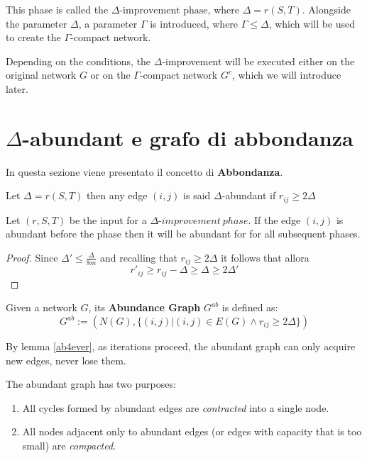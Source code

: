 This phase is called the \(\Delta\text{-improvement phase}\), where \(\Delta = r(S, T)\). Alongside the parameter \(\Delta\), a parameter \(\Gamma\) is introduced, where \(\Gamma \leq \Delta\), which will be used to create the \(\Gamma\)-compact network.

Depending on the conditions, the \(\Delta\)-improvement will be executed either on the original network \(G\) or on the \(\Gamma\)-compact network \(G^c\), which we will introduce later.
\newpage

\section{$\Delta$-abundant e grafo di abbondanza}
In questa sezione viene presentato il concetto di \textbf{Abbondanza}.

\begin{definition}
    Let $\Delta = r(S,T)$ then any edge $(i,j)$ is said $\Delta$-abundant if $r_{ij} \ge 2\Delta$ 
     
\end{definition}
\begin{lemma}
    \label{ab4ever}
    Let $(r,S,T)$ be the input for a $\Delta\text{-}improvement\ phase$. If the edge  $(i,j)$ is abundant before the phase then it will be abundant for for all subsequent phases.
\end{lemma}
\begin{proof}
    Since
    $\Delta' \le \frac{\Delta}{8m} $ and recalling that $r_{ij} \ge 2\Delta $ it follows that 
    allora \[r'_{ij} \ge r_{ij}-\Delta \ge\Delta\ge  2\Delta'\]
\end{proof}

\begin{definition}
    Given a network $G$, its \textbf{Abundance Graph} $G^{ab}$ is defined as: 
    \[G^{ab} := (N(G), \{(i,j)| (i,j)\in E(G)\land r_{ij}\ge 2\Delta\})\]
\end{definition}

\begin{obs}
    By lemma \ref{ab4ever}, as iterations proceed, the abundant graph can only acquire new edges, never lose them.
\end{obs}

The abundant graph has two purposes: 
\begin{enumerate}
    \item All cycles formed by abundant edges are \textit{contracted} into a single node.
    \item All nodes adjacent only to abundant edges (or edges with capacity that is too small) are \textit{compacted}.
\end{enumerate}

